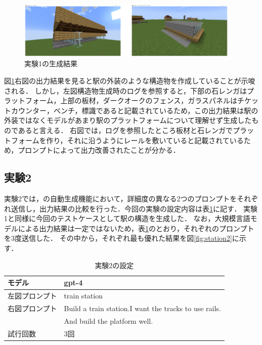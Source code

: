 \begin{figure}[H]
    \centering
    \includegraphics[width=0.95\textwidth]{fig/train_station1.PNG}
    \caption{実験1の生成結果}
    \label{fig:station1}
\end{figure}

図\ref{fig:station1}右図の出力結果を見ると駅の外装のような構造物を作成していることが示唆される．
しかし，左図構造物生成時のログを参照すると，下部の石レンガはプラットフォーム，上部の板材，ダークオークのフェンス，ガラスパネルはチケットカウンター，ベンチ，標識であると記載されているため，この出力結果は駅の外装ではなくモデルがあまり駅のプラットフォームについて理解せず生成したものであると言える．
右図では，ログを参照したところ板材と石レンガでプラットフォームを作り，それに沿うようにレールを敷いていると記載されているため，プロンプトによって出力改善されたことが分かる．

\subsection{実験2}\label{sec:ex2}
実験2では，{\mason}の自動生成機能において，詳細度の異なる2つのプロンプトをそれぞれ送信し，出力結果の比較を行った．今回の実験の設定内容は表\ref{tab:setting2}に記す．
実験1と同様に今回のテストケースとして駅の構造を生成した．
なお，大規模言語モデルによる出力結果は一定ではないため，表\ref{tab:setting2}のとおり，それぞれのプロンプトを3度送信した．
その中から，それぞれ最も優れた結果を図\ref{fig:station2}に示す．
\begin{table}[H]
    \caption{実験2の設定}\label{tab:setting2}
    \centering
    \begin{tabular}{ll}
        \hline \hline
        モデル & gpt-4 \\
        \hline
        左図プロンプト & train station \\
        \hline
        右図プロンプト & Build a train station.I want the tracks to use rails. \\
        　 & And build the platform well. \\
        \hline
        試行回数 & 3回 \\
        \hline
    \end{tabular}
\end{table}

